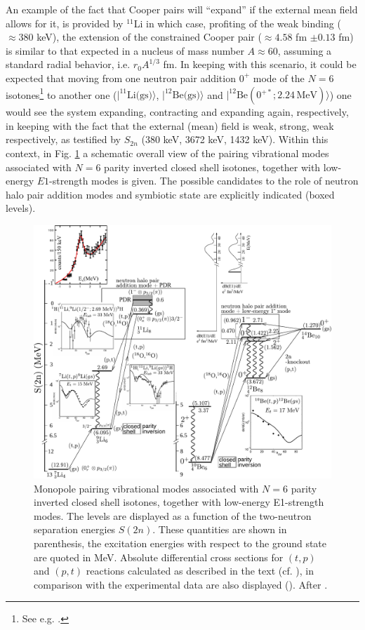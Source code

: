 An example of the fact that Cooper pairs will ``expand'' if the external mean field allows for it, is provided by $^{11}$Li 
 in which case, profiting of the weak binding ($\approx 380$ keV), the extension of the constrained Cooper  pair ($\approx 4.58 $ fm $\pm 0.13$ fm)   is similar to that expected in a nucleus of mass number $A\approx 60$, assuming a standard radial behavior, i.e. $r_0 A^{1/3}$ fm. In keeping with this scenario, it could be expected that moving from one neutron pair addition $0^+$ mode of the $N=6$ isotones\footnote{See e.g. \cite{Gori:04}.} to another one ($|^{11}\text{Li(gs)}\rangle$, $|^{12}\text{Be(gs)}\rangle$ and $|^{12}\text{Be}(0^{+*};2.24\,\text{MeV})\rangle$) one would see the system expanding, contracting and expanding again, respectively, in keeping with the fact that the external (mean) field is weak, strong, weak respectively, as testified by $S_{2n}$ (380 keV, 3672 keV, 1432 keV).  
Within this context, in Fig. \ref{fig3.8.1} a schematic overall view of the pairing vibrational modes associated with $N=6$ parity inverted closed shell isotones, together with low-energy $E1$-strength modes is given. The possible candidates to the role of neutron halo pair addition modes and symbiotic state are explicitly indicated (boxed levels). 
\begin{figure}
	\centerline{\includegraphics*[width=20cm,angle=90]{nutshell/figs/fig3_8_1_v3}}
	\caption{Monopole pairing vibrational modes associated with 
		$N=6$ parity inverted closed shell isotones, together with low-energy E1-strength modes. 
		The levels are  displayed as a function of the two-neutron separation energies $S(2n)$. 
		These quantities are shown in parenthesis, the excitation energies with respect to the ground state are quoted in MeV. 
		Absolute differential cross sections for  $(t,p)$ and $(p,t)$ reactions calculated as described in the text (cf. \cite{Potel:10,Potel:14}), 
		in comparison with the experimental data are also displayed (\cite{Young:71,Fortune:94}). After \cite{Broglia:16}.}\label{fig3.8.1}
\end{figure}
